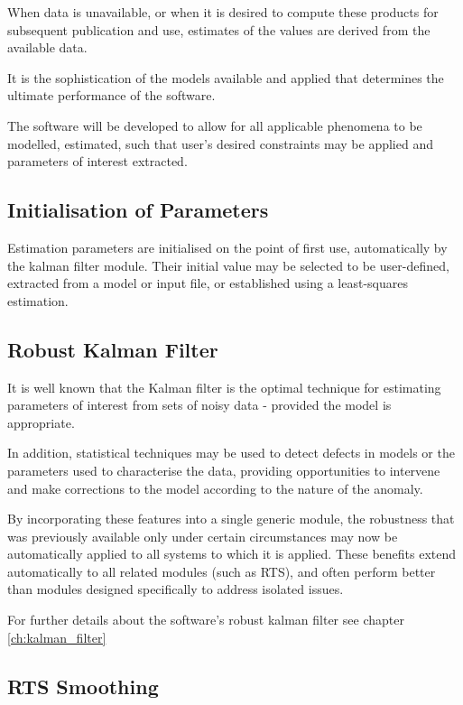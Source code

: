 When data is unavailable, or when it is desired to compute these products for subsequent publication and use, estimates of the values are derived from the available data.

It is the sophistication of the models available and applied that determines the ultimate performance of the software.

The software will be developed to allow for all applicable phenomena to be modelled, estimated, such that user’s desired constraints may be applied and parameters of interest extracted.


\subsection{Initialisation of Parameters}

Estimation parameters are initialised on the point of first use, automatically by the kalman filter module. Their initial value may be selected to be user-defined, extracted from a model or input file, or established using a least-squares estimation.


\subsection{Robust Kalman Filter}

It is well known that the Kalman filter is the optimal technique for estimating parameters of interest from sets of noisy data - provided the model is appropriate.

In addition, statistical techniques may be used to detect defects in models or the parameters used to characterise the data, providing opportunities to intervene and make corrections to the model according to the nature of the anomaly.

By incorporating these features into a single generic module, the robustness that was previously available only under certain circumstances may now be automatically applied to all systems to which it is applied. These benefits extend automatically to all related modules (such as RTS), and often perform better than modules designed specifically to address isolated issues.

For further details about the software's robust kalman filter see chapter \ref{ch:kalman_filter}



\subsection{RTS Smoothing}

